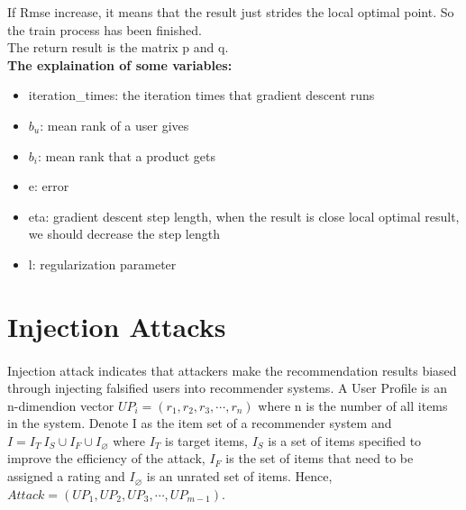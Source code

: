 \documentclass[a4paper, 12pt]{article}
\theoremstyle{definition}
\begin{document}
If Rmse increase, it means that the result just strides the local optimal point. So the train process has been finished.\\


The return result is the matrix p and q.\\


\textbf{The explaination of some variables:} 
\begin{itemize}
	
	\item iteration\_times: the iteration times that gradient descent runs
	\item $b_u$: mean rank of a user gives
	\item $b_i$: mean rank that a product gets
	\item e: error
	\item eta: gradient descent step length, when the result is close local optimal result, we should decrease the step length 
	\item l: regularization parameter
\end{itemize}

\section{Injection Attacks}
\paragraph{}Injection attack indicates that attackers make the recommendation results biased through injecting falsified users into recommender systems. A User Profile is an n-dimendion vector $UP_i = (r_1,r_2,r_3,\cdots,r_n)$ where n is the number of all items in the system. Denote I as the item set of a recommender system and $I = I_T \ I_S \cup I_F \cup I_{\varnothing}$ where $I_T$ is target items, $I_S$ is a set of items specified to improve the efficiency of the attack, $I_F$ is the set of items that need to be assigned a rating and $I_{\varnothing}$ is an unrated set of items. Hence, $Attack = (UP_1, UP_2, UP_3,\cdots, UP_{m-1})$.
\end{document}

